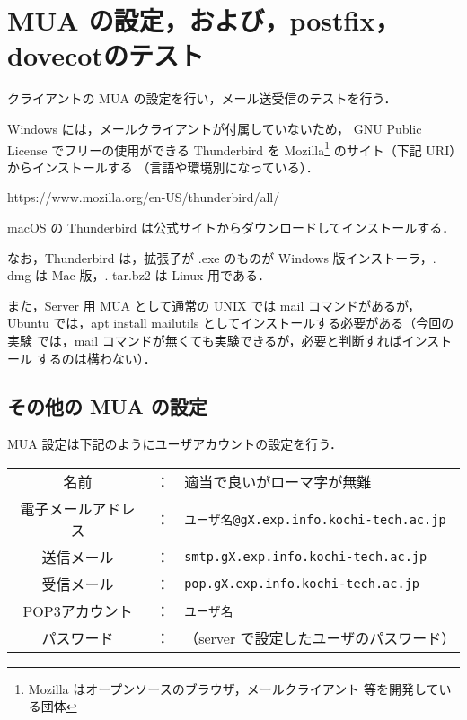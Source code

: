 \section{MUA の設定，および，postfix，dovecotのテスト}
クライアントの MUA の設定を行い，メール送受信のテストを行う．

Windows には，メールクライアントが付属していないため，
GNU Public License でフリーの使用ができる Thunderbird を
Mozilla\footnote{Mozilla はオープンソースのブラウザ，メールクライアント
等を開発している団体} のサイト（下記 URI）からインストールする
（言語や環境別になっている）．

\begin{center}
https://www.mozilla.org/en-US/thunderbird/all/ 
\end{center}


macOS の Thunderbird は公式サイトからダウンロードしてインストールする．

なお，Thunderbird は，拡張子が .exe のものが Windows 版インストーラ，.
dmg は Mac 版，.  tar.bz2 は Linux 用である．

また，Server 用 MUA として通常の UNIX では mail コマンドがあるが，Ubuntu 
では，apt install mailutils としてインストールする必要がある（今回の実験
では，mail コマンドが無くても実験できるが，必要と判断すればインストール
するのは構わない）．

\subsection*{その他の MUA の設定}

MUA 設定は下記のようにユーザアカウントの設定を行う．

\begin{center}
\begin{breakbox}
\begin{tabular}{ccl}
名前&：&適当で良いがローマ字が無難\\
電子メールアドレス&：&\texttt{ユーザ名@gX.exp.info.kochi-tech.ac.jp}\\
送信メール&：&\texttt{smtp.gX.exp.info.kochi-tech.ac.jp}\\
受信メール&：&\texttt{pop.gX.exp.info.kochi-tech.ac.jp}\\
POP3アカウント&：&\texttt{ユーザ名}\\
パスワード&：&（server で設定したユーザのパスワード）
\end{tabular}
\end{breakbox}
\end{center}

